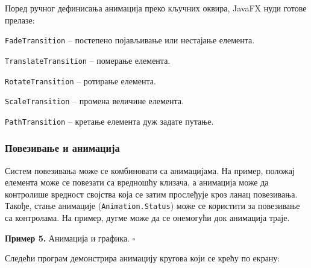 Поред ручног дефинисања анимација преко кључних оквира, JavaFX нуди готове прелазе:

\texttt{FadeTransition} – постепено појављивање или нестајање елемента.

\texttt{TranslateTransition} – померање елемента.

\texttt{RotateTransition} – ротирање елемента.

\texttt{ScaleTransition} – промена величине елемента.

\texttt{PathTransition} – кретање елемента дуж задате путање.

\subsubsection{Повезивање и анимација}

Систем повезивања може се комбиновати са анимацијама. На пример, положај елемента може се повезати са вредношћу клизача, а анимација може да контролише вредност својства која се затим прослеђује кроз ланац повезивања. Такође, стање анимације (\texttt{Animation.Status}) може се користити за повезивање са контролама. На пример, дугме може да се онемогући док анимација траје.


\bigskip

\noindent \textbf{Пример 5.} Анимација и графика. $\square$

\medskip

Следећи програм демонстрира анимацију кругова који се крећу по екрану:



